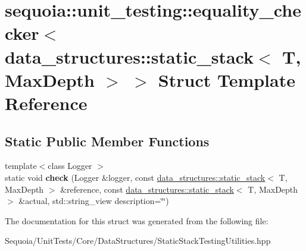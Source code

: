 \hypertarget{structsequoia_1_1unit__testing_1_1equality__checker_3_01data__structures_1_1static__stack_3_01_t_00_01_max_depth_01_4_01_4}{}\section{sequoia\+::unit\+\_\+testing\+::equality\+\_\+checker$<$ data\+\_\+structures\+::static\+\_\+stack$<$ T, Max\+Depth $>$ $>$ Struct Template Reference}
\label{structsequoia_1_1unit__testing_1_1equality__checker_3_01data__structures_1_1static__stack_3_01_t_00_01_max_depth_01_4_01_4}
\subsection*{Static Public Member Functions}
\begin{DoxyCompactItemize}
\item 
\mbox{\label{structsequoia_1_1unit__testing_1_1equality__checker_3_01data__structures_1_1static__stack_3_01_t_00_01_max_depth_01_4_01_4_a38eaa5950f9b25fc70cff8d6a7878713}} 
{\footnotesize template$<$class Logger $>$ }\\static void {\bfseries check} (Logger \&logger, const \mbox{\hyperlink{classsequoia_1_1data__structures_1_1static__stack}{data\+\_\+structures\+::static\+\_\+stack}}$<$ T, Max\+Depth $>$ \&reference, const \mbox{\hyperlink{classsequoia_1_1data__structures_1_1static__stack}{data\+\_\+structures\+::static\+\_\+stack}}$<$ T, Max\+Depth $>$ \&actual, std\+::string\+\_\+view description=\char`\"{}\char`\"{})
\end{DoxyCompactItemize}


The documentation for this struct was generated from the following file\+:\begin{DoxyCompactItemize}
\item 
Sequoia/\+Unit\+Tests/\+Core/\+Data\+Structures/Static\+Stack\+Testing\+Utilities.\+hpp\end{DoxyCompactItemize}
